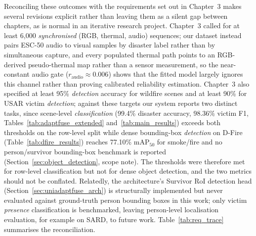 \documentclass[journal]{IEEEtran}
\begin{document}
Reconciling these outcomes with the requirements set out in Chapter~3 makes several revisions explicit rather than leaving them as a silent gap between chapters, as is normal in an iterative research project. Chapter~3 called for at least 6{,}000 \textit{synchronised} (RGB, thermal, audio) sequences; our dataset instead pairs ESC-50 audio to visual samples by disaster label rather than by simultaneous capture, and every populated thermal path points to an RGB-derived pseudo-thermal map rather than a sensor measurement, so the near-constant audio gate ($r_{\text{audio}} \approx 0.006$) shows that the fitted model largely ignores this channel rather than proving calibrated reliability estimation. Chapter~3 also specified at least 95\% \textit{detection} accuracy for wildfire scenes and at least 90\% for USAR victim \textit{detection}; against these targets our system reports two distinct tasks, since scene-level \textit{classification} (99.4\% disaster accuracy, 98.36\% victim F1, Tables~\ref{tab:adaptfuse_extended} and~\ref{tab:main_results}) exceeds both thresholds on the row-level split while dense bounding-box \textit{detection} on D-Fire (Table~\ref{tab:dfire_results}) reaches 77.10\% mAP$_{50}$ for smoke/fire and no person/survivor bounding-box benchmark is reported (Section~\ref{sec:object_detection}, scope note). The thresholds were therefore met for row-level classification but not for dense object detection, and the two metrics should not be conflated. Relatedly, the architecture's Survivor RoI detection head (Section~\ref{sec:uniadaptfuse_arch}) is structurally implemented but never evaluated against ground-truth person bounding boxes in this work; only victim \textit{presence} classification is benchmarked, leaving person-level localisation evaluation, for example on SARD, to future work. Table~\ref{tab:req_trace} summarises the reconciliation.
\end{document}
